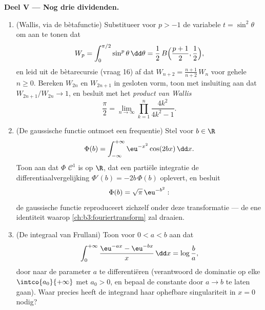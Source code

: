 \begin{problem}
\medskip
\noindent\textbf{Deel V --- Nog drie dividenden.}
\begin{enumerate}[resume]
  \item (Wallis, via de bètafunctie) Substitueer voor $p > -1$ de
        variabele $t = \sin^2\theta$ om aan te tonen dat
        \[
        W_p = \int_0^{\pi/2}\sin^p\theta\,\dd\theta
        = \frac12\,B\Bigl(\frac{p+1}2, \frac12\Bigr),
        \]
        en leid uit de bètarecursie (vraag 16) af dat $W_{n+2} =
        \frac{n+1}{n+2}\,W_n$ voor gehele $n \geq 0$. Bereken
        $W_{2n}$ en $W_{2n+1}$ in gesloten vorm, toon met
        insluiting aan dat $W_{2n+1}/W_{2n} \to 1$, en besluit met
        het \emph{product van Wallis}
        \[
        \frac\pi2 = \lim_{n\to\infty}
        \prod_{k=1}^{n}\frac{4k^2}{4k^2 - 1} .
        \]
  \item (De gaussische functie ontmoet een frequentie) Stel voor
        $b \in \R$
        \[
        \Phi(b) = \int_{-\infty}^{+\infty}
        \eu^{-x^2}\cos(2bx)\,\dd x .
        \]
        Toon aan dat $\Phi$ $\mathcal C^1$ is op $\R$, dat een
        partiële integratie de differentiaalvergelijking $\Phi'(b)
        = -2b\,\Phi(b)$ oplevert, en besluit
        \[
        \Phi(b) = \sqrt\pi\,\eu^{-b^2} :
        \]
        de gaussische functie reproduceert zichzelf onder deze
        transformatie --- de ene identiteit waarop
        \cref{ch:b3:fouriertransform} zal draaien.
  \item (De integraal van Frullani) Toon voor $0 < a < b$ aan dat
        \[
        \int_0^{+\infty}
        \frac{\eu^{-ax} - \eu^{-bx}}{x}\,\dd x
        = \log\frac ba ,
        \]
        door naar de parameter $a$ te differentiëren (verantwoord
        de dominatie op elke $\intco{a_0}{+\infty}$ met $a_0 > 0$,
        en bepaal de constante door $a \to b$ te laten gaan). Waar
        precies heeft de integrand haar ophefbare singulariteit in
        $x = 0$ nodig?
\end{enumerate}
\end{problem}
